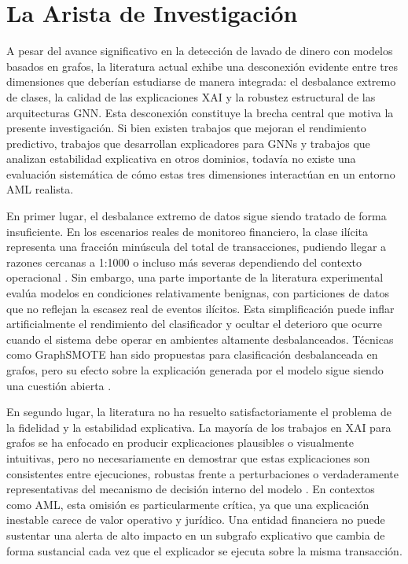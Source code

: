 \section{La Arista de Investigación}

A pesar del avance significativo en la detección de lavado de dinero con modelos basados en grafos, la literatura actual exhibe una desconexión evidente entre tres dimensiones que deberían estudiarse de manera integrada: el desbalance extremo de clases, la calidad de las explicaciones XAI y la robustez estructural de las arquitecturas GNN. Esta desconexión constituye la brecha central que motiva la presente investigación. Si bien existen trabajos que mejoran el rendimiento predictivo, trabajos que desarrollan explicadores para GNNs y trabajos que analizan estabilidad explicativa en otros dominios, todavía no existe una evaluación sistemática de cómo estas tres dimensiones interactúan en un entorno AML realista.

\bigskip

En primer lugar, el desbalance extremo de datos sigue siendo tratado de forma insuficiente. En los escenarios reales de monitoreo financiero, la clase ilícita representa una fracción minúscula del total de transacciones, pudiendo llegar a razones cercanas a 1:1000 o incluso más severas dependiendo del contexto operacional \cite{Rai2025EvaluatingData, Unagar2025SurveyXAI}. Sin embargo, una parte importante de la literatura experimental evalúa modelos en condiciones relativamente benignas, con particiones de datos que no reflejan la escasez real de eventos ilícitos. Esta simplificación puede inflar artificialmente el rendimiento del clasificador y ocultar el deterioro que ocurre cuando el sistema debe operar en ambientes altamente desbalanceados. Técnicas como GraphSMOTE han sido propuestas para clasificación desbalanceada en grafos, pero su efecto sobre la explicación generada por el modelo sigue siendo una cuestión abierta \cite{Zhao2021Graphsmote:Networks}.

\bigskip

En segundo lugar, la literatura no ha resuelto satisfactoriamente el problema de la fidelidad y la estabilidad explicativa. La mayoría de los trabajos en XAI para grafos se ha enfocado en producir explicaciones plausibles o visualmente intuitivas, pero no necesariamente en demostrar que estas explicaciones son consistentes entre ejecuciones, robustas frente a perturbaciones o verdaderamente representativas del mecanismo de decisión interno del modelo \cite{Agarwal2022ProbingMethods, Armgaan2025GnnXemplar:Interpretability, Kosan2023GNNX-BENCH:Benchmarking}. En contextos como AML, esta omisión es particularmente crítica, ya que una explicación inestable carece de valor operativo y jurídico. Una entidad financiera no puede sustentar una alerta de alto impacto en un subgrafo explicativo que cambia de forma sustancial cada vez que el explicador se ejecuta sobre la misma transacción.

